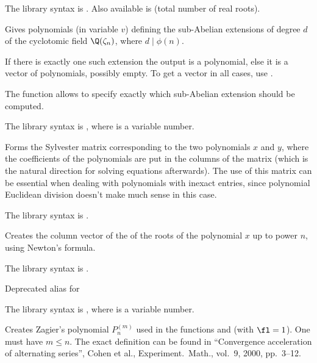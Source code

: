 The library syntax is .
Also available is  (total number of real
roots).

\label{se:polsubcyclo}
Gives polynomials (in variable $v$) defining the sub-Abelian extensions
of degree $d$ of the cyclotomic field $\Q(\zeta_n)$, where $d\mid \phi(n)$.

If there is exactly one such extension the output is a polynomial, else it is
a vector of polynomials, possibly empty. To get a vector in all cases,
use .

The function  allows to specify exactly which
sub-Abelian extension should be computed.

The library syntax is , where  is a variable number.

\label{se:polsylvestermatrix}
Forms the Sylvester matrix
corresponding to the two polynomials $x$ and $y$, where the coefficients of
the polynomials are put in the columns of the matrix (which is the natural
direction for solving equations afterwards). The use of this matrix can be
essential when dealing with polynomials with inexact entries, since
polynomial Euclidean division doesn't make much sense in this case.

The library syntax is .

\label{se:polsym}
Creates the column vector of the  of the roots of the
polynomial $x$ up to power $n$, using Newton's formula.

The library syntax is .

\label{se:poltchebi}
Deprecated alias for 

The library syntax is , where  is a variable number.

\label{se:polzagier}
Creates Zagier's polynomial $P_n^{(m)}$ used in
the functions  and  (with $\fl=1$). One must have $m\le
n$. The exact definition can be found in ``Convergence acceleration of
alternating series'', Cohen et al., Experiment.~Math., vol.~9, 2000, pp.~3--12.

